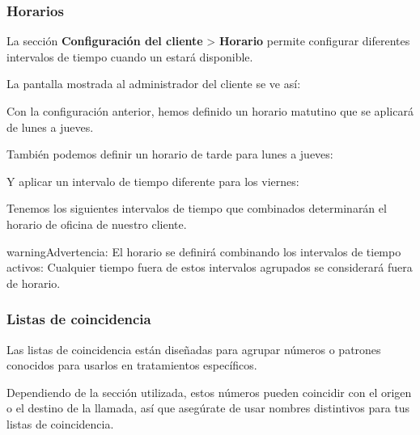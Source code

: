 \documentclass[letterpaper,10pt,spanish]{sphinxmanual}
\begin{document}
\subsubsection{Horarios}
\label{administration_portal/client/vpbx/routing_tools/schedules:id1}\label{administration_portal/client/vpbx/routing_tools/schedules::doc}\label{administration_portal/client/vpbx/routing_tools/schedules:schedules}
La sección \textbf{Configuración del cliente} \textgreater{} \textbf{Horario} permite configurar diferentes intervalos de tiempo cuando un {\hyperref[administration_portal/brand/views/ddis:ddis]{}} estará disponible.

La pantalla mostrada al administrador del cliente se ve así:

Con la configuración anterior, hemos definido un horario matutino que se aplicará de lunes a jueves.

También podemos definir un horario de tarde para lunes a jueves:

Y aplicar un intervalo de tiempo diferente para los viernes:

Tenemos los siguientes intervalos de tiempo que combinados determinarán el horario de oficina de nuestro cliente.

\begin{notice}{warning}{Advertencia:}
El horario se definirá combinando los intervalos de tiempo activos: Cualquier tiempo fuera de estos intervalos agrupados se considerará fuera de horario.
\end{notice}
\label{administration_portal/client/vpbx/routing_tools/match_lists:match-lists}

\subsubsection{Listas de coincidencia}
\label{administration_portal/client/vpbx/routing_tools/match_lists:match-lists}\label{administration_portal/client/vpbx/routing_tools/match_lists:id2}\label{administration_portal/client/vpbx/routing_tools/match_lists::doc}\label{administration_portal/client/vpbx/routing_tools/match_lists:id1}
Las listas de coincidencia están diseñadas para agrupar números o patrones conocidos para usarlos en tratamientos específicos.

Dependiendo de la sección utilizada, estos números pueden coincidir con el origen o el destino de la llamada, así que asegúrate de usar nombres distintivos para tus listas de coincidencia.
\end{document}
